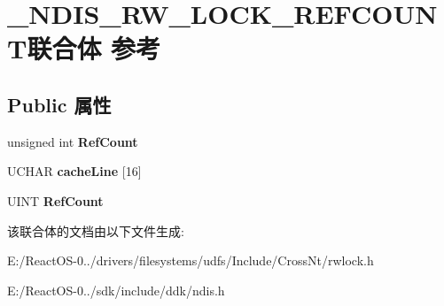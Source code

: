 \hypertarget{union___n_d_i_s___r_w___l_o_c_k___r_e_f_c_o_u_n_t}{}\section{\+\_\+\+N\+D\+I\+S\+\_\+\+R\+W\+\_\+\+L\+O\+C\+K\+\_\+\+R\+E\+F\+C\+O\+U\+N\+T联合体 参考}
\label{union___n_d_i_s___r_w___l_o_c_k___r_e_f_c_o_u_n_t}
\subsection*{Public 属性}
\begin{DoxyCompactItemize}
\item 
\mbox{\label{union___n_d_i_s___r_w___l_o_c_k___r_e_f_c_o_u_n_t_a66d8cc35aacbfdc370ad0d4b291fc22d}} 
unsigned int {\bfseries Ref\+Count}
\item 
\mbox{\label{union___n_d_i_s___r_w___l_o_c_k___r_e_f_c_o_u_n_t_a56b7f1205f9b3934743d3aa58be5427c}} 
U\+C\+H\+AR {\bfseries cache\+Line} \mbox{[}16\mbox{]}
\item 
\mbox{\label{union___n_d_i_s___r_w___l_o_c_k___r_e_f_c_o_u_n_t_a8ac72ac81fa288cb34cc9a63c0445791}} 
U\+I\+NT {\bfseries Ref\+Count}
\end{DoxyCompactItemize}


该联合体的文档由以下文件生成\+:\begin{DoxyCompactItemize}
\item 
E\+:/\+React\+O\+S-\/0../drivers/filesystems/udfs/\+Include/\+Cross\+Nt/rwlock.\+h\item 
E\+:/\+React\+O\+S-\/0../sdk/include/ddk/ndis.\+h\end{DoxyCompactItemize}
